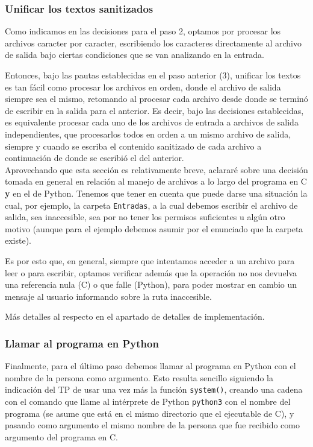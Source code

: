\documentclass[a4paper]{article}
\begin{document}
\subsubsection{Unificar los textos sanitizados}

Como indicamos en las decisiones para el paso 2, optamos por procesar los archivos caracter por caracter, escribiendo los caracteres directamente al archivo de salida bajo ciertas condiciones que se van analizando en la entrada.

Entonces, bajo las pautas establecidas en el paso anterior (3), unificar los textos es tan fácil como procesar los archivos en orden, donde el archivo de salida siempre sea el mismo, retomando al procesar cada archivo desde donde se terminó de escribir en la salida para el anterior. Es decir, bajo las decisiones establecidas, es equivalente procesar cada uno de los archivos de entrada a archivos de salida independientes, que procesarlos todos en orden a un mismo archivo de salida, siempre y cuando se escriba el contenido sanitizado de cada archivo a continuación de donde se escribió el del anterior.\\

Aprovechando que esta sección es relativamente breve, aclararé sobre una decisión tomada en general en relación al manejo de archivos a lo largo del programa en C \textbf{y} en el de Python. Tenemos que tener en cuenta que puede darse una situación la cual, por ejemplo, la carpeta \texttt{Entradas}, a la cual debemos escribir el archivo de salida, sea inaccesible, sea por no tener los permisos suficientes u algún otro motivo (aunque para el ejemplo debemos asumir por el enunciado que la carpeta existe).

Es por esto que, en general, siempre que intentamos acceder a un archivo para leer o para escribir, optamos verificar además que la operación no nos devuelva una referencia nula (C) o que falle (Python), para poder mostrar en cambio un mensaje al usuario informando sobre la ruta inaccesible.

Más detalles al respecto en el apartado de detalles de implementación. %

\subsubsection{Llamar al programa en Python}

Finalmente, para el último paso debemos llamar al programa en Python con el nombre de la persona como argumento. Esto resulta sencillo siguiendo la indicación del TP de usar una vez más la función \texttt{system()}, creando una cadena con el comando que llame al intérprete de Python \texttt{python3} con el nombre del programa (se asume que está en el mismo directorio que el ejecutable de C), y pasando como argumento el mismo nombre de la persona que fue recibido como argumento del programa en C.
\end{document}
